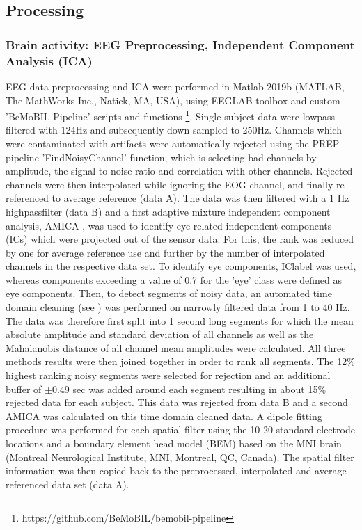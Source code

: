 \subsection{Processing}

\subsubsection{Brain activity: EEG Preprocessing, Independent Component Analysis (ICA)}
EEG data preprocessing and ICA were performed in Matlab 2019b (MATLAB, The MathWorks Inc., Natick, MA, USA), using EEGLAB toolbox \cite{Delorme2004a} and custom 'BeMoBIL Pipeline' scripts and functions \footnote{https://github.com/BeMoBIL/bemobil-pipeline}. Single subject data were lowpass filtered with 124Hz and subsequently down-sampled to 250Hz. Channels which were contaminated with artifacts were automatically rejected using the PREP pipeline \cite{Bigdely-Shamlo2015} 'FindNoisyChannel' function, which is selecting bad channels by amplitude, the signal to noise ratio and correlation with other channels. Rejected channels were then interpolated while ignoring the EOG channel, and finally re-referenced to average reference (data A). The data was then filtered with a 1 Hz highpassfilter (data B) and a first adaptive mixture independent component analysis, AMICA \cite{Palmer2011}, was used to identify eye related independent components (ICs) which were projected out of the sensor data. For this, the rank was reduced by one for average reference use and further by the number of interpolated channels in the respective data set. To identify eye components, IClabel \cite{Pion-Tonachini2019} was used, whereas components exceeding a value of 0.7 for the 'eye' class were defined as eye components. Then, to detect segments of noisy data, an automated time domain cleaning (see \citet{Gramann2018}) was performed on narrowly filtered data from 1 to 40 Hz. The data was therefore first split into 1 second long segments for which the mean absolute amplitude and standard deviation of all channels as well as the Mahalanobis distance of all channel mean amplitudes were calculated. All three methods results were then joined together in order to rank all segments. The 12\% highest ranking noisy segments were selected for rejection and an additional buffer of $\pm 0.49$ sec was added around each segment resulting in about 15\% rejected data for each subject. This data was rejected from data B and a second AMICA was calculated on this time domain cleaned data. A dipole fitting procedure was performed for each spatial filter using the 10-20 standard electrode locations and a boundary element head model (BEM) based on the MNI brain (Montreal Neurological Institute, MNI, Montreal, QC, Canada). The spatial filter information was then copied back to the preprocessed, interpolated and average referenced data set (data A). 

